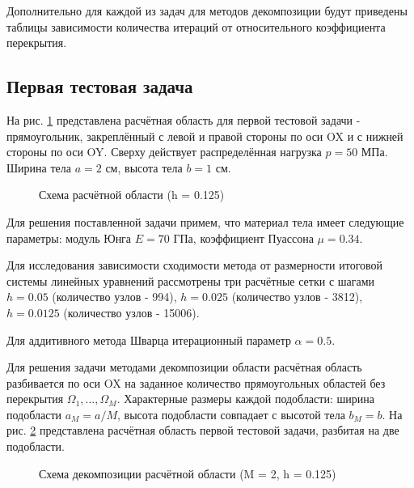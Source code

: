 \documentclass[a4paper, 14pt]{extarticle}
\newcommand{\area}{rectangle}
\newcommand{\task}{3_fixes}
\newcommand{\taskNum}{01}
\begin{document}
Дополнительно для каждой из задач для методов декомпозиции будут приведены таблицы зависимости количества итераций от относительного коэффициента перекрытия.

\newpage

\subsection{Первая тестовая задача}

На рис. \ref{fig:task_\taskNum_scheme} представлена расчётная область для первой тестовой задачи - прямоугольник, закреплённый с левой и правой стороны по оси OX и с нижней стороны по оси OY. Сверху действует распределённая нагрузка $p = 50$ МПа. Ширина тела $a = 2$ см, высота тела $b = 1$ см.

\begin{figure}[h]
\caption{Схема расчётной области (h = 0.125)}
\label{fig:task_\taskNum_scheme}
\end{figure}

Для решения поставленной задачи примем, что материал тела имеет следующие параметры: модуль Юнга $E = 70$ ГПа, коэффициент Пуассона $\mu = 0.34$. 

Для исследования зависимости сходимости метода от размерности итоговой системы линейных уравнений рассмотрены три расчётные сетки с шагами $h = 0.05$ (количество узлов - 994), $h = 0.025$ (количество узлов - 3812), $h = 0.0125$ (количество узлов - 15006).

Для аддитивного метода Шварца итерационный параметр $\alpha = 0.5$.

\newpage

Для решения задачи методами декомпозиции области расчётная область разбивается по оси OX на заданное количество прямоугольных областей без перекрытия $\Omega_1, \ldots, \Omega_M$. Характерные размеры каждой подобласти: ширина подобласти $a_M = a / M$, высота подобласти совпадает с высотой тела $b_M = b$. На рис. \ref{fig:task_\taskNum_decomposition} представлена расчётная область первой тестовой задачи, разбитая на две подобласти.

\begin{figure}[h]
\caption{Схема декомпозиции расчётной области (M = 2, h = 0.125)}
\label{fig:task_\taskNum_decomposition}
\end{figure}
\end{document}
